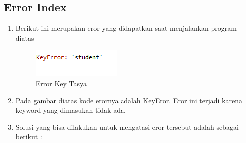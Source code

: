 \subsection{Error Index}
\begin{enumerate}
	\item
Berikut ini merupakan eror yang didapatkan saat menjalankan program diatas
\begin{figure}[ht]
\centering
\includegraphics[scale=0.5]{figures/praktektasyaeror1.png}
\caption{Error Key Tasya }
\label{Error}
\end{figure}
\item
Pada gambar diatas kode erornya adalah KeyEror. Eror ini terjadi karena keyword yang dimasukan tidak ada.
\item
Solusi yang bisa dilakukan untuk mengatasi eror tersebut adalah sebagai berikut : 
\end{enumerate}

